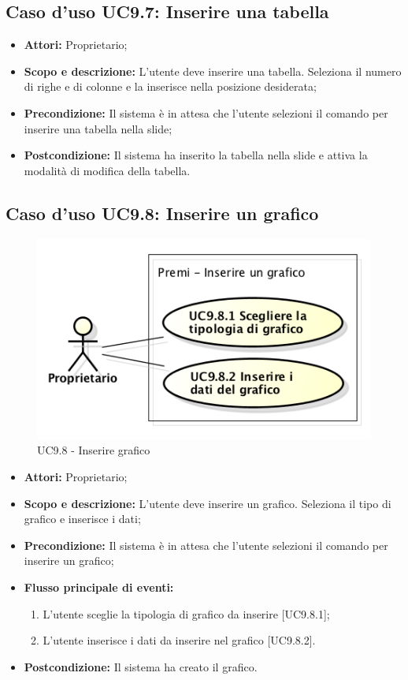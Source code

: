 \subsection{Caso d'uso UC9.7: Inserire una tabella}
\begin{itemize}
	\item \textbf{Attori:} Proprietario;
	\item \textbf{Scopo e descrizione:} L'utente deve inserire una tabella. Seleziona il numero di righe e di colonne e la inserisce nella posizione desiderata;
	\item \textbf{Precondizione:} Il sistema è in attesa che l'utente selezioni il comando per inserire una tabella nella slide;
	\item \textbf{Postcondizione:} Il sistema ha inserito la tabella nella slide e attiva la modalità di modifica della tabella.
\end{itemize}


\subsection{Caso d'uso UC9.8: Inserire un grafico}
\begin{figure}[h] 
	\centering 
	\includegraphics[scale=0.45] {img/UC9.8.png} 
	\caption{UC9.8 - Inserire grafico} 
\end{figure}

\begin{itemize}
	\item \textbf{Attori:} Proprietario;
	\item \textbf{Scopo e descrizione:} L'utente deve inserire un grafico. Seleziona il tipo di grafico e inserisce i dati;
	\item \textbf{Precondizione:} Il sistema è in attesa che l'utente selezioni il comando per inserire un grafico;
	\item \textbf{Flusso principale di eventi:}
	\begin{enumerate}
		\item L'utente sceglie la tipologia di grafico da inserire [UC9.8.1];
		\item L'utente inserisce i dati da inserire nel grafico [UC9.8.2].
	\end{enumerate}
	\item \textbf{Postcondizione:} Il sistema ha creato il grafico.
\end{itemize}

